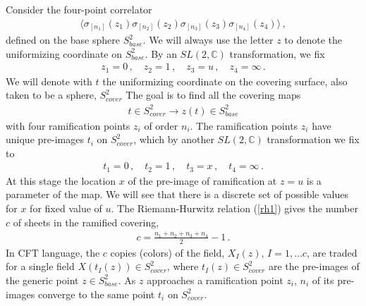 \documentclass[letterpaper]{JHEP3}
\def\be{\begin{equation}}
\def\ee{\end{equation}}
\def\be{\begin{eqnarray}}
\def\ee{\end{eqnarray}}
\begin{document}
Consider the four-point correlator
\be
\langle \sigma_{[n_1]}(z_1)   \sigma_{[n_2]}(z_2)  \sigma_{[n_3]}(z_3)  \sigma_{[n_4]}(z_4)   \rangle \, ,
\ee
defined on the base  sphere $S^2_{base}$. We will always use the letter $z$ to denote the uniformizing coordinate on  $S^2_{base}$. 
By an $SL(2, \mathbb{C})$ transformation, we fix
\be \label{zi}
z_1 = 0 \, ,\quad z_2 = 1 \, , \quad z_3 = u \, , \quad z_4 = \infty \,.
\ee
We will denote with $t$ the uniformizing coordinate on the covering surface, also taken to be a sphere,  $S^2_{cover}$
 The goal is to find  all the covering maps 
 \be
 t  \in S^2_{cover} \to z(t) \in S^2_{base}
 \ee
with  four ramification points $z_i$ of order $n_i$. The ramification points $z_i$ have unique pre-images $t_i$ on $S^2_{cover}$,
which by another $SL(2, \mathbb{C})$ transformation we fix to
\be \label{ti}
t_1 = 0 \, ,\quad t_2 = 1 \, , \quad t_3 = x \, , \quad t_4 = \infty \,.
\ee
At this stage the location $x$ of the pre-image of ramification at $z=u$  is a parameter of the map. We will
see that there is a discrete set of possible values for $x$  for fixed value of $u$.
The   Riemann-Hurwitz relation (\ref{rh1}) gives the number $c$ of sheets in the ramified covering,
\be \label{rh2}
c = \frac{n_1 +n_2 +n_3 +n_4}{2} -1 \,.
\ee
In CFT language, the $c$  copies (colors) of the field, 
  $X_I(z)$, $I = 1, \dots c$, are traded
for a single field $X(t_I(z)) \in S^2_{cover}$, where $t_I(z) \in S^2_{cover}$ are the pre-images
of the generic point  $z \in S^2_{base}$. As $z$ approaches a ramification point $z_i$, 
$n_i$ of its pre-images converge to the same point $t_i$ on $S^2_{cover}$.
\end{document}
